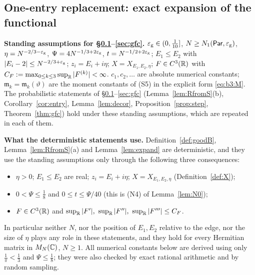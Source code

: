 
\subsection{One-entry replacement: exact expansion of the functional}\label{sec:step}
\textbf{Standing assumptions for \S\ref{sec:step}--\ref{sec:gfc}.} $\varepsilon_{\mathrm g}\in(0,\frac1{10}]$, $N\ge N_1(\mathsf{Par},\varepsilon_{\mathrm g})$,
$\eta=N^{-2/3-\varepsilon_{\mathrm g}}$, $\Psi=4N^{-1/3+2\varepsilon_{\mathrm g}}$, $t=N^{-1/2+2\varepsilon_{\mathrm g}}$; $E_1\le E_2$ with $|E_i-2|\le N^{-2/3+\varepsilon_{\mathrm g}}$; $z_i=E_i+i\eta$;
$X=X_{E_1,E_2,\eta}$; $F\in C^3(\mathbb{R})$ with $C_F:=\max_{0\le k\le3}\sup_{\mathbb{R}}|F^{(k)}|<\infty$. $c_1,c_2,\dots$ are absolute
numerical constants; $\mathfrak m_k=\mathfrak m_k(\vartheta)$ are the moment constants of (S5) in the explicit form \eqref{eq:b3:M}.
The probabilistic statements of \S\ref{sec:step}--\ref{sec:gfc} (Lemma~\ref{lem:RfromS}(b), Corollary~\ref{cor:entry}, Lemma~\ref{lem:decor}, Proposition~\ref{prop:step}, Theorem~\ref{thm:gfc}) hold
under these standing assumptions, which are repeated in each of them.

\medskip\noindent\textbf{What the deterministic statements use.} Definition~\ref{def:goodB}, Lemma~\ref{lem:RfromS}(a) and Lemma~\ref{lem:expand} are
deterministic, and they use the standing assumptions only through the following three consequences:
\begin{itemize}\itemsep0pt
\item[\textup{(D1)}] $\eta>0$; $E_1\le E_2$ are real; $z_i=E_i+i\eta$; $X=X_{E_1,E_2,\eta}$ (Definition~\ref{def:X});
\item[\textup{(D2)}] $0<\Psi\le\frac18$ and $0\le t\le\Psi/40$ \quad(this is \textup{(N4)} of Lemma~\ref{lem:N0});
\item[\textup{(D3)}] $F\in C^3(\mathbb{R})$ and $\sup_{\mathbb{R}}|F'|,\ \sup_{\mathbb{R}}|F''|,\ \sup_{\mathbb{R}}|F'''|\le C_F$.
\end{itemize}
In particular neither $N$, nor the position of $E_1,E_2$ relative to the edge, nor the size of $\eta$ plays any role in these statements, and
they hold for every Hermitian matrix in $M_N(\mathbb{C})$, $N\ge1$. All numerical constants below are derived using only $\frac1\pi<\frac13$ and
$\Psi\le\frac18$; they were also checked by exact rational arithmetic and by random sampling.

